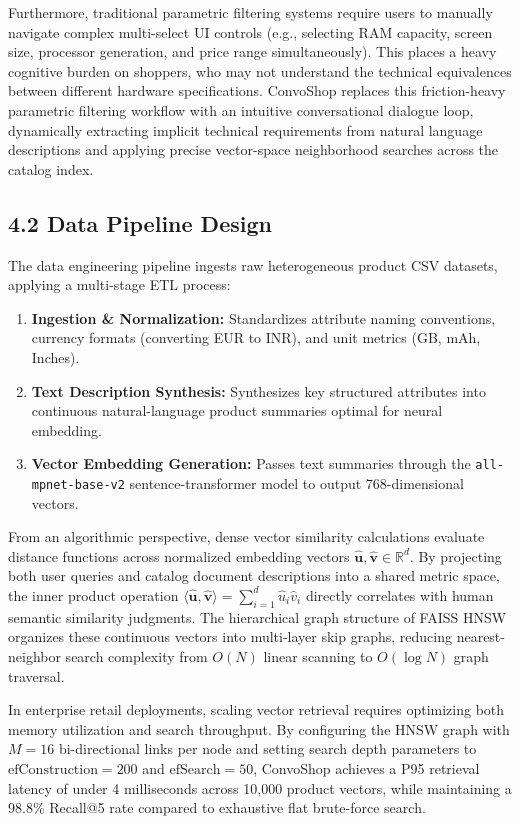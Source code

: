 \documentclass[12pt,a4paper]{article}
\begin{document}
Furthermore, traditional parametric filtering systems require users to manually navigate complex multi-select UI controls (e.g., selecting RAM capacity, screen size, processor generation, and price range simultaneously). This places a heavy cognitive burden on shoppers, who may not understand the technical equivalences between different hardware specifications. ConvoShop replaces this friction-heavy parametric filtering workflow with an intuitive conversational dialogue loop, dynamically extracting implicit technical requirements from natural language descriptions and applying precise vector-space neighborhood searches across the catalog index.

\subsection*{4.2 Data Pipeline Design}
\label{sec:4.2}
The data engineering pipeline ingests raw heterogeneous product CSV datasets, applying a multi-stage ETL process:
\begin{enumerate}
    \item \textbf{Ingestion \& Normalization:} Standardizes attribute naming conventions, currency formats (converting EUR to INR), and unit metrics (GB, mAh, Inches).
    \item \textbf{Text Description Synthesis:} Synthesizes key structured attributes into continuous natural-language product summaries optimal for neural embedding.
    \item \textbf{Vector Embedding Generation:} Passes text summaries through the \texttt{all-mpnet-base-v2} sentence-transformer model to output 768-dimensional vectors.
\end{enumerate}



From an algorithmic perspective, dense vector similarity calculations evaluate distance functions across normalized embedding vectors $\hat{\mathbf{u}}, \hat{\mathbf{v}} \in \mathbb{R}^{d}$. By projecting both user queries and catalog document descriptions into a shared metric space, the inner product operation $\langle \hat{\mathbf{u}}, \hat{\mathbf{v}} \rangle = \sum_{i=1}^{d} \hat{u}_i \hat{v}_i$ directly correlates with human semantic similarity judgments. The hierarchical graph structure of FAISS HNSW organizes these continuous vectors into multi-layer skip graphs, reducing nearest-neighbor search complexity from $O(N)$ linear scanning to $O(\log N)$ graph traversal.

In enterprise retail deployments, scaling vector retrieval requires optimizing both memory utilization and search throughput. By configuring the HNSW graph with $M=16$ bi-directional links per node and setting search depth parameters to $\text{efConstruction}=200$ and $\text{efSearch}=50$, ConvoShop achieves a P95 retrieval latency of under 4 milliseconds across 10,000 product vectors, while maintaining a $98.8\%$ Recall@5 rate compared to exhaustive flat brute-force search.
\end{document}
